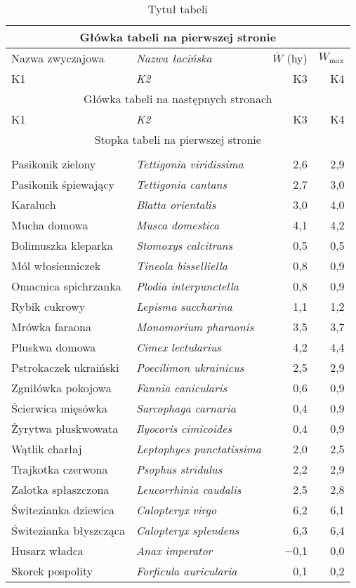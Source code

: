 \documentclass[a4paper]{article}
\begin{document}
\begin{longtable}{|l|>{\itshape}l|r|r|}
 \caption{Tytuł tabeli}\\\hline
 \multicolumn{4}{|c|}{Główka tabeli na pierwszej stronie}\\ \hline 
  Nazwa zwyczajowa & Nazwa łacińska & $\bar W$ (hy) & $W_{\textrm{max}}$ \\ \hline
  K1 & K2 & K3 & K4 \\ \hline
 \endfirsthead
 \hline
 \multicolumn{4}{|c|}{Główka tabeli na następnych stronach}\\
 \hline K1 & K2 & K3 & K4\\\hline
 \endhead
 \hline \multicolumn{4}{|c|}{Stopka tabeli na pierwszej stronie}\\ \hline
 \endfoot
 \hline \multicolumn{4}{|c|}{Stopka na ostatniej stronie}\\
 \hline
 \endlastfoot
Pasikonik zielony     & Tettigonia viridissima  &   2,6  &  2,9 \\
Pasikonik śpiewający  & Tettigonia cantans      &   2,7  &  3,0 \\
Karaluch              & Blatta orientalis       &   3,0  &  4,0 \\
Mucha domowa          & Musca domestica         &   4,1  &  4,2 \\
Bolimuszka kleparka   & Stomoxys calcitrans     &   0,5  &  0,5 \\
Mól włosienniczek     & Tineola bisselliella    &   0,8  &  0,9 \\
Omacnica spichrzanka  & Plodia interpunctella   &   0,8  &  0,9 \\
Rybik cukrowy         & Lepisma saccharina      &   1,1  &  1,2 \\
Mrówka faraona        & Monomorium pharaonis    &   3,5  &  3,7 \\
Pluskwa domowa        & Cimex lectularius       &   4,2  &  4,4 \\
Pstrokaczek ukraiński & Poecilimon ukrainicus   &   2,5  &  2,9 \\
Zgniłówka pokojowa    & Fannia canicularis      &   0,6  &  0,9 \\
Ścierwica mięsówka    & Sarcophaga carnaria     &   0,4  &  0,9 \\
Żyrytwa pluskwowata   & Ilyocoris cimicoides    &   0,4  &  0,9 \\
Wątlik charłaj        & Leptophyes punctatissima  & 2,0  &  2,5 \\
Trajkotka czerwona    & Psophus stridulus       &   2,2  &  2,9 \\
Zalotka spłaszczona   & Leucorrhinia caudalis   &   2,5  &  2,8 \\
Świtezianka dziewica  & Calopteryx virgo        &   6,2  &  6,1 \\
Świtezianka błyszcząca& Calopteryx splendens    &   6,3  &  6,4 \\
Husarz władca         & Anax imperator          & $-$0,1 &  0,0 \\
Skorek pospolity      & Forficula auricularia   &   0,1  &  0,2 \\
\end{longtable}
\end{document}

